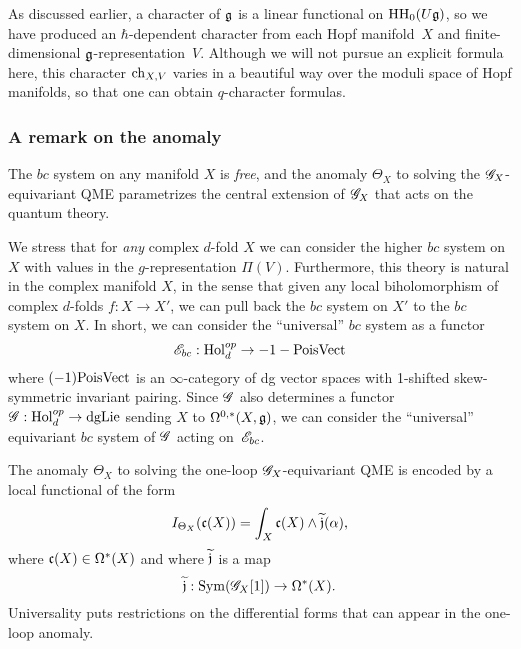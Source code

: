 As discussed earlier, a character of $\mathfrak g$ is a linear functional on ${\rm HH}_0(U \mathfrak g)$,
so we have produced an $\hbar$-dependent character from each Hopf manifold~$X$ and finite-dimensional $\mathfrak g$-representation~$V$.
Although we will not pursue an explicit formula here, 
this character ${\rm ch}_{X,V}$ varies in a beautiful way over the moduli space of Hopf manifolds,
so that one can obtain $q$-character formulas.


\subsubsection{A remark on the anomaly}\label{sec: hopfobs}

The $bc$ system on any manifold $X$ is {\em free}, and the anomaly $\Theta_X$ to solving the $\mathscr G_X$-equivariant QME parametrizes the central extension of $\mathscr G_X$ that acts on the quantum theory.


We stress that for {\em any} complex $d$-fold $X$ we can consider the higher $bc$ system on $X$ with values in the $g$-representation $\Pi(V)$. 
Furthermore, this theory is natural in the complex manifold $X$, in the sense that given any local biholomorphism of complex $d$-folds $f : X \to X'$, 
we can pull back the $bc$ system on $X'$ to the $bc$ system on $X$. 
In short, we can consider the ``universal'' $bc$ system as a functor
\[
\mathscr E_{bc} : {\rm Hol}_d^{op} \to -1-{\rm PoisVect}
\]
where $(-1){\rm PoisVect}$ is an $\infty$-category of dg vector spaces with 1-shifted skew-symmetric invariant pairing. 
Since $\mathscr G$ also determines a functor $\mathscr G: {\rm Hol}_d^{op} \to {\rm dgLie}$ sending $X$ to $\Omega^{0,*}(X, \mathfrak g)$, we can consider the ``universal'' equivariant $bc$ system of $\mathscr G$ acting on~$\mathscr E_{bc}$. 

The anomaly $\Theta_X$ to solving the one-loop $\mathscr G_X$-equivariant QME is encoded by a local functional of the form
\[
I_{\Theta_X}(\mathfrak c(X))=\int_X \mathfrak c(X) \wedge \widetilde{\mathfrak j}(\alpha),
\]
where $\mathfrak c(X) \in \Omega^*(X)$ and where $\widetilde{\mathfrak j}$ is a map
\[
\widetilde{\mathfrak j} : {\rm Sym}(\mathscr G_X[1]) \to \Omega^*(X) .
\]
Universality puts restrictions on the differential forms that can appear in the one-loop anomaly. 

